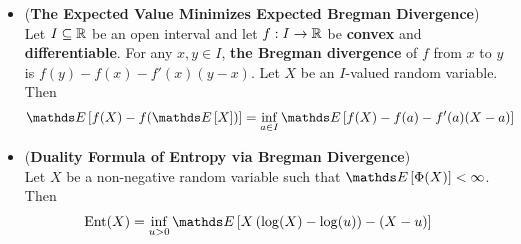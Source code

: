 \documentclass[11pt]{article}
\begin{document}
\begin{itemize}
\item \begin{theorem} (\textbf{The Expected Value Minimizes Expected Bregman Divergence}) \citep{boucheron2013concentration} \\
Let $I \subseteq {\mathbb R}$ be an open interval and let $f: I \to {\mathbb R}$ be \textbf{convex} and \textbf{differentiable}. For any $x,y \in I$, \textbf{the Bregman divergence} of $f$ from $x$ to $y$ is $f(y) - f(x) - f'(x)(y-x)$. Let $X$ be an $I$-valued random variable. Then
\begin{align}
\E{}{f(X) - f(\E{}{X}) } &= \inf_{a \in I}\E{}{f(X) - f(a) - f'(a)(X-a)}\label{eqn: bregmann_inf}
\end{align}
\end{theorem}

\item \begin{corollary} (\textbf{Duality Formula of Entropy via Bregman Divergence}) \citep{boucheron2013concentration}\\
Let $X$ be a non-negative random variable such that $\E{}{\Phi(X)} < \infty$. Then 
\begin{align}
\text{Ent}(X) &= \inf_{u > 0}\E{}{X\paren{\log(X) - \log(u)} - (X - u) } \label{eqn: duality_entropy_3_breg}
\end{align}
\end{corollary}
\end{itemize}
\end{document}
